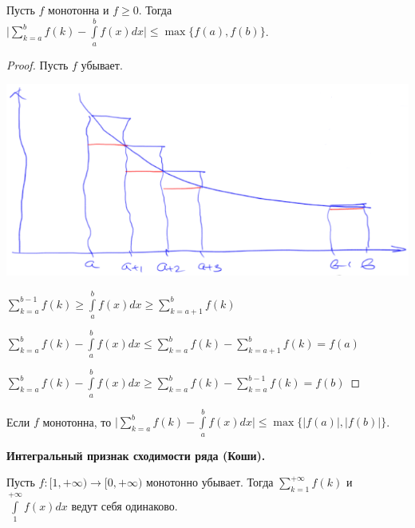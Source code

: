 \begin{theorem}
    Пусть $f$ монотонна и $f\geq 0$. Тогда $\bigg|\sum\limits_{k=a}^bf(k)-\int\limits_a^b f(x)dx\bigg|\leq \max \{f(a), f(b)\}$.
\end{theorem}

\begin{proof}
    Пусть $f$ убывает.

    \includegraphics[width=0.5\linewidth]{images/12-04-1.png}

    $\sum\limits_{k=a}^{b-1}f(k)\geq \int\limits_a^b f(x)dx\geq \sum\limits_{k=a+1}^{b}f(k)$

    $\sum\limits_{k=a}^bf(k)-\int\limits_a^b f(x)dx\leq \sum\limits_{k=a}^bf(k) - \sum\limits_{k=a+1}^bf(k)=f(a)$

    $\sum\limits_{k=a}^bf(k)-\int\limits_a^b f(x)dx\geq \sum\limits_{k=a}^bf(k) - \sum\limits_{k=a}^{b-1}f(k)=f(b)$
\end{proof}

\begin{exercise}
    Если $f$ монотонна, то $\bigg|\sum\limits_{k=a}^bf(k)-\int\limits_a^b f(x) dx\bigg|\leq \max \{|f(a)|, |f(b)|\}$.
\end{exercise}

\begin{theorem}
    \textbf{Интегральный признак сходимости ряда (Коши).}

    Пусть $f:[1, +\infty)\rightarrow[0, +\infty)$ монотонно убывает. Тогда $\sum\limits_{k=1}^{+\infty}f(k)$ и $\int\limits_1^{+\infty}f(x) dx$ ведут себя одинаково. 
\end{theorem}

